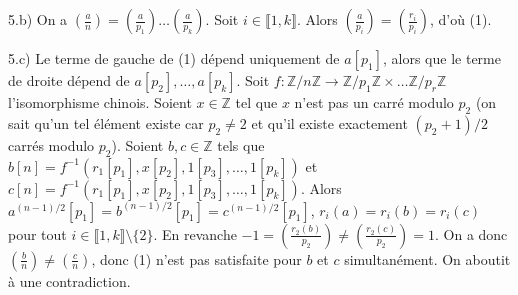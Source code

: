 \documentclass[11pt,a4paper]{article}
\newcommand{\Z}{\mathbb{Z}}
\begin{document}
\begin{itemize}
5.b) On a  $\left(\frac{a}{n}\right)=\left(\frac{a}{p_1}\right)\ldots \left(\frac{a}{p_k}\right)$.  Soit $i\in \llbracket 1,k\rrbracket$. Alors $\left(\frac{a}{p_i}\right)=\left(\frac{r_i}{p_i}\right)$, d'où (1). 
 
5.c) Le terme de gauche de (1) dépend uniquement de $a[p_1]$, alors que le terme de droite dépend de $a[p_2],\ldots, a[p_k]$. Soit $f:\Z/n\Z\rightarrow \Z/p_1\Z\times \ldots \Z/p_r\Z$ l'isomorphisme chinois. Soient $x\in \Z$ tel que $x$ n'est pas un carré modulo $p_2$ (on sait qu'un tel élément existe car $p_2\neq 2$ et qu'il existe exactement $(p_2+1)/2$ carrés modulo $p_2$). Soient $b,c\in \Z$ tels que   $b[n]=f^{-1}(r_1[p_1],x[p_2],1[p_3],\ldots,1[p_k])$ et $c[n]=f^{-1}(r_1[p_1],x[p_2],1[p_3],\ldots,1[p_k])$. Alors $a^{(n-1)/2}[p_1]=b^{(n-1)/2}[p_1]=c^{(n-1)/2}[p_1]$, $r_i(a)=r_i(b)=r_i(c)$ pour tout $i\in \llbracket 1,k\rrbracket\setminus \{2\}$. En revanche $-1=\left(\frac{r_2(b)}{p_2}\right)\neq \left(\frac{r_2(c)}{p_2}\right)=1$. On a donc $\left(\frac{b}{n}\right)\neq \left(\frac{c}{n}\right)$, donc (1) n'est pas satisfaite pour $b$ et $c$ simultanément. On aboutit à une contradiction.

\end{itemize}
\end{document}
